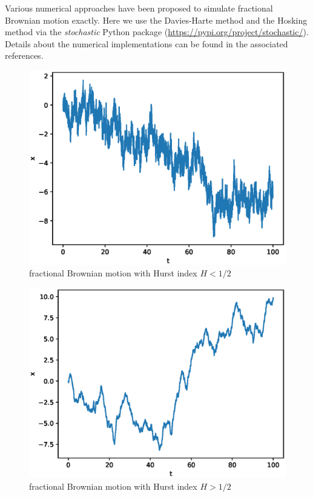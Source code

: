 \documentclass[aps, pre, preprint, amsmath, amssymb]{revtex4}
\begin{document}
Various numerical approaches have been proposed to simulate fractional Brownian motion exactly. Here we use the Davies-Harte method \cite{davies1987tests, dieker2004simulation} and the Hosking method \cite{hosking1984modeling, dieker2004simulation} via the \textit{stochastic} Python package (\url{https://pypi.org/project/stochastic/}). Details about the numerical implementations can be found in the associated references.
\begin{figure}[H]
\centering
\includegraphics[scale=0.5]{figures/fbm1}
\caption{fractional Brownian motion with Hurst index $H<1/2$}
\end{figure}
\begin{figure}[H]
\centering
\includegraphics[scale=0.5]{figures/fbm2}
\caption{fractional Brownian motion with Hurst index $H>1/2$}
\end{figure}
\end{document}
